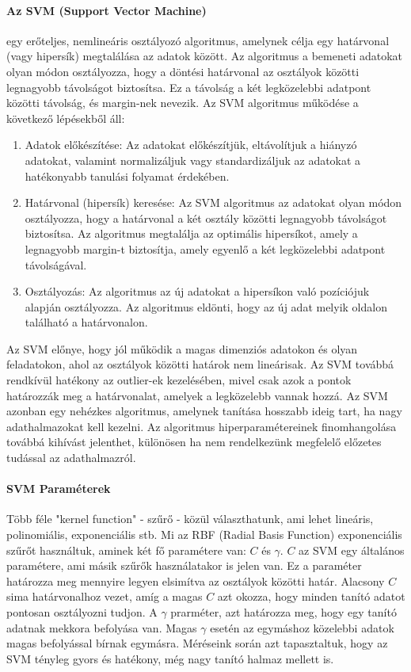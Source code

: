 \documentclass[12pt,a4paper]{article}
\begin{document}
\paragraph{Az SVM (Support Vector Machine)} egy erőteljes, nemlineáris osztályozó algoritmus, amelynek célja egy határvonal (vagy hipersík) megtalálása az adatok között. Az algoritmus a bemeneti adatokat olyan módon osztályozza, hogy a döntési határvonal az osztályok közötti legnagyobb távolságot biztosítsa. Ez a távolság a két legközelebbi adatpont közötti távolság, és margin-nek nevezik.
Az SVM algoritmus működése a következő lépésekből áll:
\begin{enumerate}
    \item Adatok előkészítése: Az adatokat előkészítjük, eltávolítjuk a hiányzó adatokat, valamint normalizáljuk vagy standardizáljuk az adatokat a hatékonyabb tanulási folyamat érdekében.
    \item Határvonal (hipersík) keresése: Az SVM algoritmus az adatokat olyan módon osztályozza, hogy a határvonal a két osztály közötti legnagyobb távolságot biztosítsa. Az algoritmus megtalálja az optimális hipersíkot, amely a legnagyobb margin-t biztosítja, amely egyenlő a két legközelebbi adatpont távolságával.
    \item Osztályozás: Az algoritmus az új adatokat a hipersíkon való pozíciójuk alapján osztályozza. Az algoritmus eldönti, hogy az új adat melyik oldalon található a határvonalon.
\end{enumerate}
Az SVM előnye, hogy jól működik a magas dimenziós adatokon és olyan feladatokon, ahol az osztályok közötti határok nem lineárisak. Az SVM továbbá rendkívül hatékony az outlier-ek kezelésében, mivel csak azok a pontok határozzák meg a határvonalat, amelyek a legközelebb vannak hozzá. Az SVM azonban egy nehézkes algoritmus, amelynek tanítása hosszabb ideig tart, ha nagy adathalmazokat kell kezelni. Az algoritmus hiperparamétereinek finomhangolása továbbá kihívást jelenthet, különösen ha nem rendelkezünk megfelelő előzetes tudással az adathalmazról.
\paragraph{SVM Paraméterek} Több féle "kernel function" - szűrő - közül választhatunk, ami lehet lineáris, polinomiális, exponenciális stb. Mi az RBF (Radial Basis Function) exponenciális szűrőt használtuk, aminek két fő paramétere van: $C$ és $\gamma$. $C$ az SVM egy általános paramétere, ami másik szűrők használatakor is jelen van. Ez a paraméter határozza meg mennyire legyen elsimítva az osztályok közötti határ. Alacsony $C$ sima határvonalhoz vezet, amíg a magas $C$ azt okozza, hogy minden tanító adatot pontosan osztályozni tudjon. A $\gamma$ prarméter, azt határozza meg, hogy egy tanító adatnak mekkora befolyása van. Magas $\gamma$ esetén az egymáshoz közelebbi adatok magas befolyással bírnak egymásra. Méréseink során azt tapasztaltuk, hogy az SVM tényleg gyors és hatékony, még nagy tanító halmaz mellett is.
\end{document}
